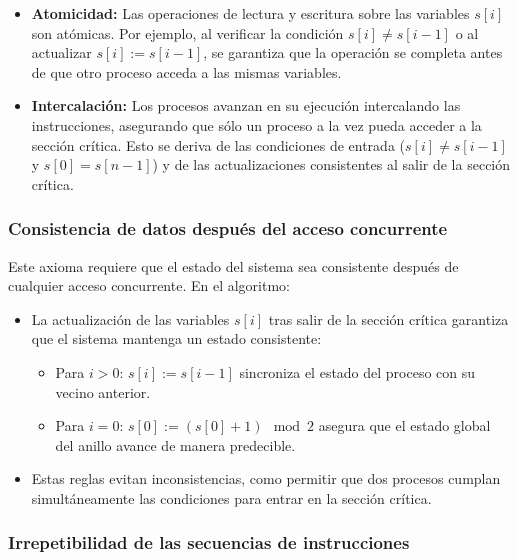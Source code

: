 \documentclass[a4paper,12pt]{article}
\begin{document}
\begin{itemize}
    \item \textbf{Atomicidad:}  
    Las operaciones de lectura y escritura sobre las variables \( s[i] \) son atómicas. Por ejemplo, al verificar la condición \( s[i] \neq s[i-1] \) o al actualizar \( s[i] := s[i-1] \), se garantiza que la operación se completa antes de que otro proceso acceda a las mismas variables.
    
    \item \textbf{Intercalación:}  
    Los procesos avanzan en su ejecución intercalando las instrucciones, asegurando que sólo un proceso a la vez pueda acceder a la sección crítica. Esto se deriva de las condiciones de entrada (\( s[i] \neq s[i-1] \) y \( s[0] = s[n-1] \)) y de las actualizaciones consistentes al salir de la sección crítica.
\end{itemize}

\subsubsection{Consistencia de datos después del acceso concurrente}

Este axioma requiere que el estado del sistema sea consistente después de cualquier acceso concurrente. En el algoritmo:

\begin{itemize}
    \item La actualización de las variables \( s[i] \) tras salir de la sección crítica garantiza que el sistema mantenga un estado consistente:
    \begin{itemize}
        \item Para \( i > 0 \): \( s[i] := s[i-1] \) sincroniza el estado del proceso con su vecino anterior.
        \item Para \( i = 0 \): \( s[0] := (s[0] + 1) \mod 2 \) asegura que el estado global del anillo avance de manera predecible.
    \end{itemize}
    \item Estas reglas evitan inconsistencias, como permitir que dos procesos cumplan simultáneamente las condiciones para entrar en la sección crítica.
\end{itemize}

\subsubsection{Irrepetibilidad de las secuencias de instrucciones}
\end{document}
